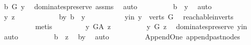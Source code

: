 \begin{isabellebody}
\ {\isachardoublequoteopen}b\ {\isasymrightarrow}\isactrlbsub G\isactrlesub \ y{\isachardoublequoteclose}\ \isamarkupfalse%
\ dominates{\isacharunderscore}{\kern0pt}preserve\ assms{\isacharparenleft}{\kern0pt}{}{\isacharparenright}{\kern0pt}\ \isamarkupfalse%
\ auto\isanewline
\ \ \ \ \ \ \isamarkupfalse%
\ \isamarkupfalse%
\ {\isachardoublequoteopen}b\ {\isasymrightarrow}\isactrlsup {\isacharplus}{\kern0pt}\ y{\isachardoublequoteclose}\ \isamarkupfalse%
\ auto\isanewline
\ \ \ \ \isamarkupfalse%
\isanewline
\ \ \ \ \ \ \isamarkupfalse%
\ y\ z\ \ \ \ \isanewline
\ \ \ \ \ \ \isamarkupfalse%
\ b{\isacharunderscore}{\kern0pt}y{\isacharcolon}{\kern0pt}\ {\isachardoublequoteopen}b\ {\isasymrightarrow}\isactrlsup {\isacharplus}{\kern0pt}\ y{\isachardoublequoteclose}\ \isanewline
\ \ \ \ \ \ \isamarkupfalse%
\ \isamarkupfalse%
\ y{\isacharunderscore}{\kern0pt}in{\isacharcolon}{\kern0pt}\ {\isachardoublequoteopen}y\ {\isasymin}\ verts\ G{\isachardoublequoteclose}\ \isamarkupfalse%
\ reachable{}{\isacharunderscore}{\kern0pt}in{\isacharunderscore}{\kern0pt}verts{\isacharparenleft}{\kern0pt}{}{\isacharparenright}{\kern0pt}\isanewline
\ \ \ \ \ \ \ \ \isamarkupfalse%
\ {\isacharparenleft}{\kern0pt}metis{\isacharparenright}{\kern0pt}\ \isanewline
\ \ \ \ \ \ \isamarkupfalse%
\ {\isachardoublequoteopen}y\ {\isasymrightarrow}\isactrlbsub G{\isacharunderscore}{\kern0pt}A\isactrlesub \ z{\isachardoublequoteclose}\isanewline
\ \ \ \ \ \ \isamarkupfalse%
\ \isamarkupfalse%
\ {\isachardoublequoteopen}y\ {\isasymrightarrow}\isactrlbsub G\isactrlesub \ z{\isachardoublequoteclose}\ \isamarkupfalse%
\ dominates{\isacharunderscore}{\kern0pt}preserve\ y{\isacharunderscore}{\kern0pt}in\ \isamarkupfalse%
\ auto\isanewline
\ \ \ \ \ \ \isamarkupfalse%
\ \isamarkupfalse%
\ {\isachardoublequoteopen}b\ {\isasymrightarrow}\isactrlsup {\isacharplus}{\kern0pt}\ z{\isachardoublequoteclose}\ \isamarkupfalse%
\ b{\isacharunderscore}{\kern0pt}y\ \isamarkupfalse%
\ auto\isanewline
\ \ \ \ \isamarkupfalse%
\isanewline
\ \ \isamarkupfalse%
%
\endisatagproof
{\isafoldproof}%
%
\isadelimproof
\isanewline
%
\endisadelimproof
\isanewline
{}\isamarkupfalse%
\ {\isacharparenleft}{\kern0pt}\ Append{\isacharunderscore}{\kern0pt}One{\isacharparenright}{\kern0pt}\ append{\isacharunderscore}{\kern0pt}past{\isacharunderscore}{\kern0pt}nodes{\isacharcolon}{\kern0pt}\isanewline

\end{isabellebody}
